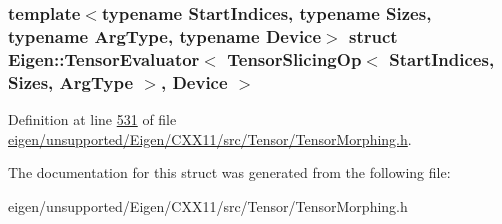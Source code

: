 \subsubsection*{template$<$typename Start\+Indices, typename Sizes, typename Arg\+Type, typename Device$>$\newline
struct Eigen\+::\+Tensor\+Evaluator$<$ Tensor\+Slicing\+Op$<$ Start\+Indices, Sizes, Arg\+Type $>$, Device $>$}



Definition at line \hyperlink{eigen_2unsupported_2_eigen_2_c_x_x11_2src_2_tensor_2_tensor_morphing_8h_source_l00531}{531} of file \hyperlink{eigen_2unsupported_2_eigen_2_c_x_x11_2src_2_tensor_2_tensor_morphing_8h_source}{eigen/unsupported/\+Eigen/\+C\+X\+X11/src/\+Tensor/\+Tensor\+Morphing.\+h}.



The documentation for this struct was generated from the following file\+:\begin{DoxyCompactItemize}
\item 
eigen/unsupported/\+Eigen/\+C\+X\+X11/src/\+Tensor/\+Tensor\+Morphing.\+h\end{DoxyCompactItemize}
